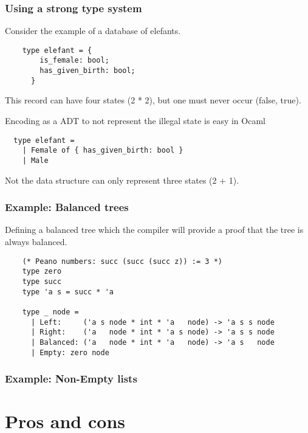 \documentclass[xcolor=svgnames]{beamer}
\renewcommand{\_}{\mathunderscore}
\begin{document}
\begin{frame}[fragile]
  \frametitle{Using a strong type system}

  Consider the example of a database of elefants.
  \pause
  \begin{lstlisting}
    type elefant = {
        is_female: bool;
        has_given_birth: bool;
      }
  \end{lstlisting}
  \pause
  This record can have four states (2 * 2), but one must never occur (false, true).\newline

  \pause

  Encoding as a ADT to not represent the illegal state is easy in Ocaml
  \pause

  \begin{lstlisting}
  type elefant =
    | Female of { has_given_birth: bool }
    | Male
  \end{lstlisting}
  Not the data structure can only represent three states (2 + 1).

\end{frame}

\begin{frame}[fragile]
  \frametitle{Example: Balanced trees}
  Defining a balanced tree which the compiler will provide a proof
  that the tree is always balanced.

  \begin{lstlisting}
    (* Peano numbers: succ (succ (succ z)) := 3 *)
    type zero
    type succ
    type 'a s = succ * 'a

    type _ node =
      | Left:     ('a s node * int * 'a   node) -> 'a s s node
      | Right:    ('a   node * int * 'a s node) -> 'a s s node
      | Balanced: ('a   node * int * 'a   node) -> 'a s   node
      | Empty: zero node
  \end{lstlisting}

\end{frame}

\begin{frame}[fragile]
  \frametitle{Example: Non-Empty lists}
  

\end{frame}




\section{Pros and cons}
\end{document}
